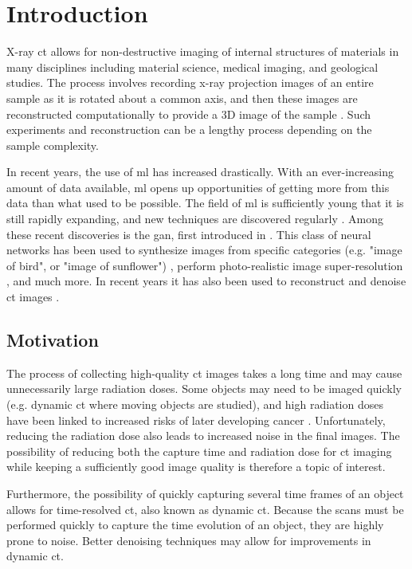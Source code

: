 \chapter{Introduction}
\label{sec:introduction}
X-ray \gls{ct} allows for non-destructive imaging of internal structures of materials in many disciplines including material science, medical imaging, and geological studies. The process involves recording x-ray projection images of an entire sample as it is rotated about a common axis, and then these images are reconstructed computationally to provide a 3D image of the sample \cite{KakSlaney98}. Such experiments and reconstruction can be a lengthy process depending on the sample complexity. 

In recent years, the use of \gls{ml} has increased drastically. With an ever-increasing amount of data available, \gls{ml} opens up opportunities of getting more from this data than what used to be possible. The field of \gls{ml} is sufficiently young that it is still rapidly expanding, and new techniques are discovered regularly \cite{Jordan255}. Among these recent discoveries is the \gls{gan}, first introduced in \citeyear{goodfellow2014gan} \cite{goodfellow2014gan}. This class of neural networks has been used to synthesize images from specific categories (e.g. "image of bird", or "image of sunflower") \cite{Bao_2017_ICCV}, perform photo-realistic image super-resolution \cite{Ledig_2017_CVPR}, and much more. In recent years it has also been used to reconstruct and denoise \gls{ct} images \cite{GANrec,liu2020tomogan}. 

\section{Motivation}
The process of collecting high-quality \gls{ct} images takes a long time and may cause unnecessarily large radiation doses. Some objects may need to be imaged quickly (e.g. dynamic \gls{ct} where moving objects are studied), and high radiation doses have been linked to increased risks of later developing cancer \cite{doi:10.1056/NEJMra072149,PEARCE2012499}. Unfortunately, reducing the radiation dose also leads to increased noise in the final images. The possibility of reducing both the capture time and radiation dose for \gls{ct} imaging while keeping a sufficiently good image quality is therefore a topic of interest. 

Furthermore, the possibility of quickly capturing several time frames of an object allows for time-resolved \gls{ct}, also known as dynamic \gls{ct}. Because the scans must be performed quickly to capture the time evolution of an object, they are highly prone to noise. Better denoising techniques may allow for improvements in dynamic \gls{ct}. 

